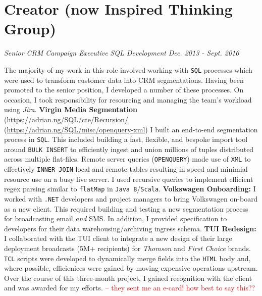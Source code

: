 \documentclass[letterpaper,11pt]{article}
\begin{document}
\section{Creator (now Inspired Thinking Group)}
\textit{Senior CRM Campaign Executive}
\hfill
\textit{SQL Development}
\hfill
\textit{Dec. 2013 - Sept. 2016\\}

\noindent
The majority of my work in this role involved working with \texttt{SQL} processes which were used to transform customer data into CRM segmentations. Having been promoted to the senior position, I developed a number of these processes. On occasion, I took responsibility for resourcing and managing the team's workload using \textit{Jira}.
\newline \newline
\noindent
\textbf{Virgin Media Segmentation}
\hfill
\tiny
(\href{https://adrian.ng/SQL/cte/Recursion/}{https://adrian.ng/SQL/cte/Recursion/}
\quad
(\href{https://adrian.ng/SQL/misc/openquery-xml}{https://adrian.ng/SQL/misc/openquery-xml})
\newline
\small
I built an end-to-end segmentation process in \texttt{SQL}. This included building a fast, flexible, and bespoke import tool around \texttt{BULK INSERT} to efficiently ingest and union millions of tuples distributed across multiple flat-files. Remote server queries (\texttt{OPENQUERY}) made use of \texttt{XML} to effectively \texttt{INNER JOIN} local and remote tables resulting in speed and minimial resource use on a busy live server. I used recursive queries to implement efficient regex parsing similar to \texttt{flatMap} in \texttt{Java 8}/\texttt{Scala}.
\newline \newline
\noindent
\textbf{Volkswagen Onboarding:}
I worked with \texttt{.NET} developers and project managers to bring Volkswagen on-board as a new client. This required building and testing a new segmentation process for broadcasting email \textit{and} SMS. In addition, I provided specification to developers for their data warehousing/archiving ingress schema.
\newline \newline
\noindent
\textbf{TUI Redesign:}
I collaborated with the TUI client to integrate a new design of their large deployment broadcasts (5M+ recipients) for \textit{Thomson} and \textit{First Choice} brands. \texttt{TCL} scripts were developed to dynamically merge fields into the \texttt{HTML} body and, where possible, efficienices were gained by moving expensive operations upstream. Over the course of this three-month project, I gained recognition with the client and was awarded for my efforts. \textcolor{red}{-- they sent me an e-card! how best to say this??}
\end{document}
